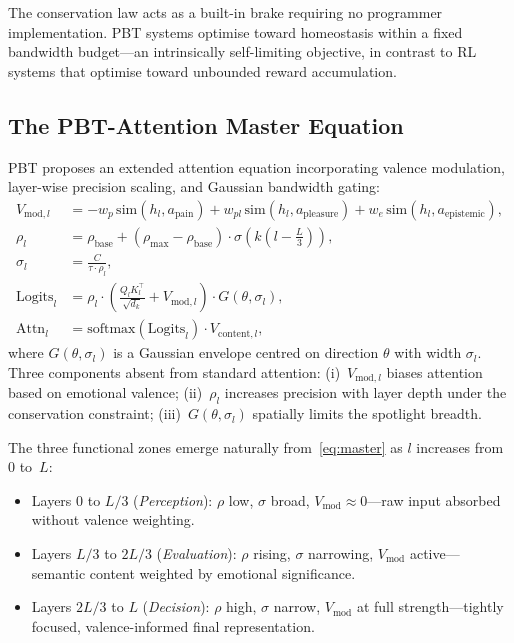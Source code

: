 \documentclass[12pt,a4paper]{article}
\begin{document}
The conservation law acts as a built-in brake requiring no programmer
implementation. PBT systems optimise toward homeostasis within a fixed
bandwidth budget---an intrinsically self-limiting objective, in contrast to
RL systems that optimise toward unbounded reward accumulation.

\subsection{The PBT-Attention Master Equation}

PBT proposes an extended attention equation incorporating valence modulation,
layer-wise precision scaling, and Gaussian bandwidth gating:
\begin{align}
  V_{\mathrm{mod},l} &= -w_p\,\mathrm{sim}(h_l,a_{\mathrm{pain}})
    + w_{pl}\,\mathrm{sim}(h_l,a_{\mathrm{pleasure}})
    + w_e\,\mathrm{sim}(h_l,a_{\mathrm{epistemic}}),
    \label{eq:Vmod}\\
  \rho_l &= \rho_{\mathrm{base}} + (\rho_{\max}-\rho_{\mathrm{base}})\cdot
    \sigma\!\left(k\!\left(l-\tfrac{L}{3}\right)\right),
    \label{eq:rho_l}\\
  \sigma_l &= \frac{C}{\tau\cdot\rho_l},
    \label{eq:sigma_l}\\
  \mathrm{Logits}_l &= \rho_l\!\cdot\!\left(\frac{Q_lK_l^\top}{\sqrt{d_k}}
    + V_{\mathrm{mod},l}\right)\!\cdot\! G(\theta,\sigma_l),
    \label{eq:master}\\
  \mathrm{Attn}_l &= \mathrm{softmax}(\mathrm{Logits}_l)\cdot
    V_{\mathrm{content},l},
\end{align}
where $G(\theta,\sigma_l)$ is a Gaussian envelope centred on direction $\theta$
with width $\sigma_l$. Three components absent from standard attention:
(i)~$V_{\mathrm{mod},l}$ biases attention based on emotional valence;
(ii)~$\rho_l$ increases precision with layer depth under the conservation
constraint; (iii)~$G(\theta,\sigma_l)$ spatially limits the spotlight breadth.

The three functional zones emerge naturally from~\eqref{eq:master} as $l$
increases from~$0$ to~$L$:
\begin{itemize}[leftmargin=1.8em]
  \item Layers $0$ to $L/3$ (\emph{Perception}): $\rho$ low, $\sigma$ broad,
    $V_{\mathrm{mod}}\approx 0$---raw input absorbed without valence weighting.
  \item Layers $L/3$ to $2L/3$ (\emph{Evaluation}): $\rho$ rising, $\sigma$
    narrowing, $V_{\mathrm{mod}}$ active---semantic content weighted by
    emotional significance.
  \item Layers $2L/3$ to $L$ (\emph{Decision}): $\rho$ high, $\sigma$ narrow,
    $V_{\mathrm{mod}}$ at full strength---tightly focused, valence-informed
    final representation.
\end{itemize}
\end{document}
